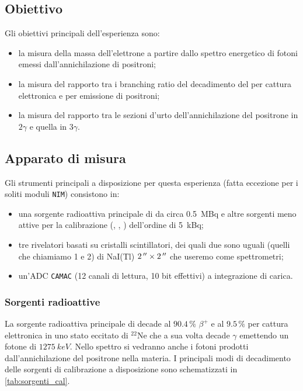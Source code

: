 \subsection{Obiettivo}
Gli obiettivi principali dell'esperienza sono:
\begin{itemize}
	\item la misura della massa dell'elettrone a partire dallo spettro energetico di fotoni emessi dall'annichilazione di positroni;
	\item la misura del rapporto tra i branching ratio del decadimento del  \na{} per cattura elettronica e per emissione di positroni;
	\item la misura del rapporto tra le sezioni d'urto dell'annichilazione del positrone in $2\gamma$ e quella in $3\gamma$.
\end{itemize}

\subsection{Apparato di misura}
Gli strumenti principali a disposizione per questa esperienza (fatta eccezione per i soliti moduli \texttt{NIM}) consistono in:
\begin{itemize}
	\item una sorgente radioattiva principale di \na{} da circa \SI{0.5}{MBq}
	e altre sorgenti meno attive per la calibrazione (\na, \cs, \co) dell'ordine di \SI{5}{kBq};
	\item tre rivelatori basati su cristalli scintillatori,
	dei quali due sono uguali (quelli che chiamiamo 1 e 2) di NaI(Tl) $\SI2{''}\times\SI2{''}$
	che useremo come spettrometri;
	\item un'ADC \texttt{CAMAC} (12 canali di lettura, 10 bit effettivi) a integrazione di carica.
\end{itemize}

\subsubsection{Sorgenti radioattive}

La sorgente radioattiva principale di \na{} decade al $90.4\,\%$ $\beta^+$ e al $9.5\,\%$ per cattura elettronica in uno stato eccitato di $^{22}$Ne che a sua volta decade $\gamma$ emettendo un fotone di $\SI{1275}{keV}$. Nello spettro si vedranno anche i fotoni prodotti dall'annichilazione del positrone nella materia.
I principali modi di decadimento delle sorgenti di calibrazione a disposizione sono schematizzati in \autoref{tab:sorgenti_cal}.


